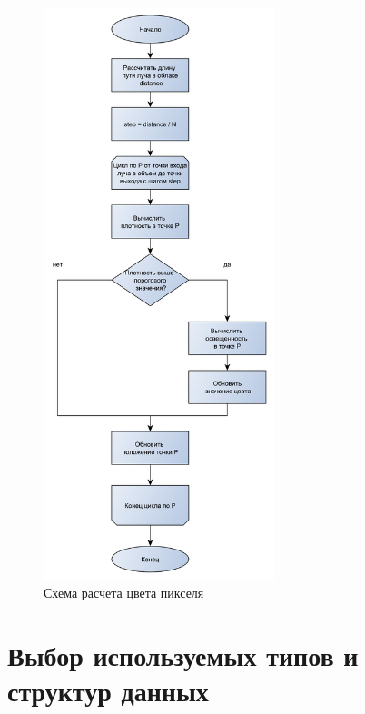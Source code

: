 \begin{figure}
	\centering
	\includegraphics[width=0.6\textwidth]{assets/img/rs2.pdf} %
	\caption{Схема расчета цвета пикселя}
	\label{fig:renderscheme2}
\end{figure}

\newpage

\section{Выбор используемых типов и структур данных}

